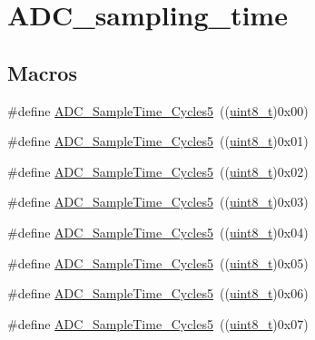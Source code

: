 \hypertarget{group___a_d_c__sampling__time}{}\section{A\+D\+C\+\_\+sampling\+\_\+time}
\label{group___a_d_c__sampling__time}
\subsection*{Macros}
\begin{DoxyCompactItemize}
\item 
\#define \hyperlink{group___a_d_c__sampling__time_gad085065e48857ada890863a7db575c6e}{A\+D\+C\+\_\+\+Sample\+Time\+\_\+Cycles5}~((\hyperlink{_p_e___types_8h_aba7bc1797add20fe3efdf37ced1182c5}{uint8\+\_\+t})0x00)
\item 
\#define \hyperlink{group___a_d_c__sampling__time_gac4101073619c4d79efa28a477696b3f5}{A\+D\+C\+\_\+\+Sample\+Time\+\_\+Cycles5}~((\hyperlink{_p_e___types_8h_aba7bc1797add20fe3efdf37ced1182c5}{uint8\+\_\+t})0x01)
\item 
\#define \hyperlink{group___a_d_c__sampling__time_gaef37e223e826ac5e6ee5ef30881f9b27}{A\+D\+C\+\_\+\+Sample\+Time\+\_\+Cycles5}~((\hyperlink{_p_e___types_8h_aba7bc1797add20fe3efdf37ced1182c5}{uint8\+\_\+t})0x02)
\item 
\#define \hyperlink{group___a_d_c__sampling__time_ga6251e64783f7a6562e17e71f7edd68d8}{A\+D\+C\+\_\+\+Sample\+Time\+\_\+Cycles5}~((\hyperlink{_p_e___types_8h_aba7bc1797add20fe3efdf37ced1182c5}{uint8\+\_\+t})0x03)
\item 
\#define \hyperlink{group___a_d_c__sampling__time_gadc3d26f9bf5fa6589889cc938c66e0e7}{A\+D\+C\+\_\+\+Sample\+Time\+\_\+Cycles5}~((\hyperlink{_p_e___types_8h_aba7bc1797add20fe3efdf37ced1182c5}{uint8\+\_\+t})0x04)
\item 
\#define \hyperlink{group___a_d_c__sampling__time_ga6a6fbbadc0e35a719fb749bf6b0704d6}{A\+D\+C\+\_\+\+Sample\+Time\+\_\+Cycles5}~((\hyperlink{_p_e___types_8h_aba7bc1797add20fe3efdf37ced1182c5}{uint8\+\_\+t})0x05)
\item 
\#define \hyperlink{group___a_d_c__sampling__time_gae46e8978ac3160969156739ddb867dae}{A\+D\+C\+\_\+\+Sample\+Time\+\_\+Cycles5}~((\hyperlink{_p_e___types_8h_aba7bc1797add20fe3efdf37ced1182c5}{uint8\+\_\+t})0x06)
\item 
\#define \hyperlink{group___a_d_c__sampling__time_ga93117dc4090dc4e3e84e0eef6d6ab073}{A\+D\+C\+\_\+\+Sample\+Time\+\_\+Cycles5}~((\hyperlink{_p_e___types_8h_aba7bc1797add20fe3efdf37ced1182c5}{uint8\+\_\+t})0x07)

\end{DoxyCompactItemize}
